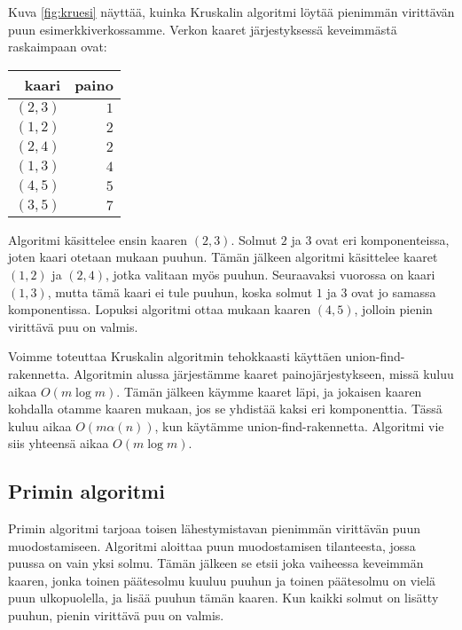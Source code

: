 Kuva \ref{fig:kruesi} näyttää, kuinka Kruskalin algoritmi löytää pienimmän virittävän
puun esimerkkiverkossamme.
Verkon kaaret järjestyksessä keveim\-mästä raskaimpaan ovat:

\begin{center}
\begin{tabular}{rr}
kaari & paino \\
\hline
$(2,3)$ & $1$ \\
$(1,2)$ & $2$ \\
$(2,4)$ & $2$ \\
$(1,3)$ & $4$ \\
$(4,5)$ & $5$ \\
$(3,5)$ & $7$ \\
\end{tabular}
\end{center}

Algoritmi käsittelee ensin kaaren $(2,3)$.
Solmut $2$ ja $3$ ovat eri komponenteissa,
joten kaari otetaan mukaan puuhun.
Tämän jälkeen algoritmi käsittelee kaaret $(1,2)$ ja $(2,4)$,
jotka valitaan myös puuhun.
Seuraavaksi vuorossa on kaari $(1,3)$,
mutta tämä kaari ei tule puuhun,
koska solmut $1$ ja $3$ ovat jo samassa komponentissa.
Lopuksi algoritmi ottaa mukaan kaaren $(4,5)$,
jolloin pienin virittävä puu on valmis.

Voimme toteuttaa Kruskalin algoritmin tehokkaasti
käyttäen union-find-rakennetta.
Algoritmin alussa järjestämme kaaret painojärjestykseen,
missä kuluu aikaa $O(m \log m)$.
Tämän jälkeen käymme kaaret läpi, ja jokaisen kaaren
kohdalla otamme kaaren mukaan, jos se yhdistää kaksi eri komponenttia.
Tässä kuluu aikaa $O(m \alpha(n))$,
kun käytämme union-find-rakennetta.
Algoritmi vie siis yhteensä aikaa $O(m \log m)$.

\subsection{Primin algoritmi}

Primin algoritmi tarjoaa toisen lähestymistavan
pienimmän virittävän puun muodostamiseen.
Algoritmi aloittaa puun muodostamisen tilanteesta,
jossa puussa on vain yksi solmu.
Tämän jälkeen se etsii joka vaiheessa keveimmän kaaren,
jonka toinen päätesolmu kuuluu puuhun ja toinen
päätesolmu on vielä puun ulkopuolella, ja lisää puuhun tämän kaaren.
Kun kaikki solmut on lisätty puuhun, pienin virittävä puu on valmis.

